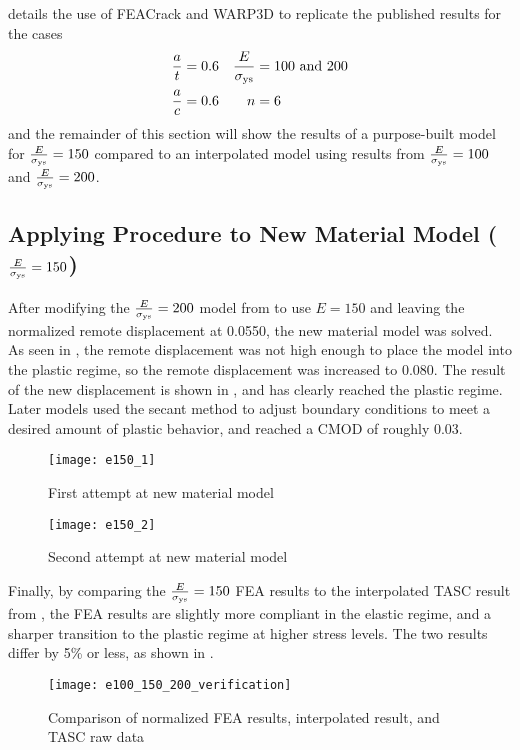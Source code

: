  details the use of FEACrack \citep{feacrack} and WARP3D \citep{warp3d} to replicate the published results for the cases
\begin{align*}
\frac{a}{t} &= 0.6 & \frac{E}{\sigma_{\textnormal{ys}}} &= 100 \text{ and } 200\\
\frac{a}{c} &= 0.6 & n &= 6
\end{align*}
and the remainder of this section will show the results of a purpose-built model for \(\frac{E}{\sigma_{\textnormal{ys}}} = 150\) compared to an interpolated model using results from \(\frac{E}{\sigma_{\textnormal{ys}}}=100\) and \(\frac{E}{\sigma_{\textnormal{ys}}}=200\).

\subsection{Applying Procedure to New Material Model (\(\frac{E}{\sigma_{\textnormal{ys}}} = 150\))}

After modifying the \(\frac{E}{\sigma_{\textnormal{ys}}} = 200\) model from  to use \(E = 150\) and leaving the normalized remote displacement at 0.0550, the new material model was solved.
As seen in , the remote displacement was not high enough to place the model into the plastic regime, so the remote displacement was increased to 0.080.
The result of the new displacement is shown in , and has clearly reached the plastic regime.
Later models used the secant method to adjust boundary conditions to meet a desired amount of plastic behavior, and reached a CMOD of roughly 0.03.
\begin{figure}[tbp]
\centering
\texttt{[image: e150\_1]}
\caption{\label{fig:e150_1} First attempt at new material model}
\end{figure}
\begin{figure}[tbp]
\centering
\texttt{[image: e150\_2]}
\caption{\label{fig:e150_2} Second attempt at new material model}
\end{figure}

Finally, by comparing the \(\frac{E}{\sigma_{\textnormal{ys}}} = 150\) FEA results to the interpolated TASC result from , the FEA results are slightly more compliant in the elastic regime, and a sharper transition to the plastic regime at higher stress levels.
The two results differ by 5\% or less, as shown in .
\begin{figure}[tbp]
\centering
\texttt{[image: e100\_150\_200\_verification]}
\caption{\label{fig:e100_150_200_verification} Comparison of normalized FEA results, interpolated result, and TASC raw data}
\end{figure}

